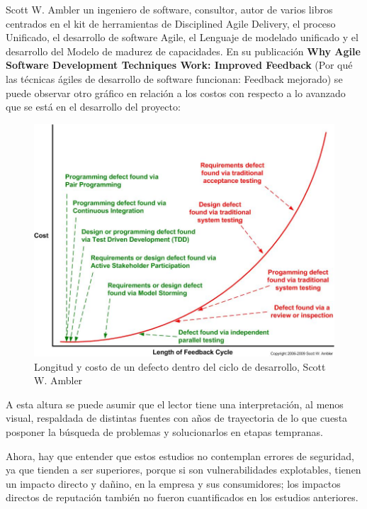 Scott W. Ambler un ingeniero de software, consultor, autor de varios libros centrados en el kit de herramientas de Disciplined Agile Delivery, el proceso Unificado, el desarrollo de software Agile, el Lenguaje de modelado unificado y el desarrollo del Modelo de madurez de capacidades. En su publicación \textbf{Why Agile Software Development Techniques Work: Improved Feedback}\cite{ambler2006agile} (Por qué las técnicas ágiles de desarrollo de software funcionan: Feedback mejorado) se puede observar otro gráfico en relación a los costos con respecto a lo avanzado que se está en el desarrollo del proyecto:

\begin{figure}[h]
    \centering
    \includegraphics[scale=0.5]{images/ComparingTechniques.jpg}
    \caption{Longitud y costo de un defecto dentro del ciclo de desarrollo, Scott W. Ambler}
    \label{fig:cost-of-change curve}
\end{figure}

A esta altura se puede asumir que el lector tiene una interpretación, al menos visual, respaldada de distintas fuentes con años de trayectoria de lo que cuesta posponer la búsqueda de problemas y solucionarlos en etapas tempranas.

Ahora, hay que entender que estos estudios no contemplan errores de seguridad, ya que tienden a ser superiores, porque si son vulnerabilidades explotables, tienen un impacto directo y dañino, en la empresa y sus consumidores; los impactos directos de reputación también no fueron cuantificados en los estudios anteriores.

